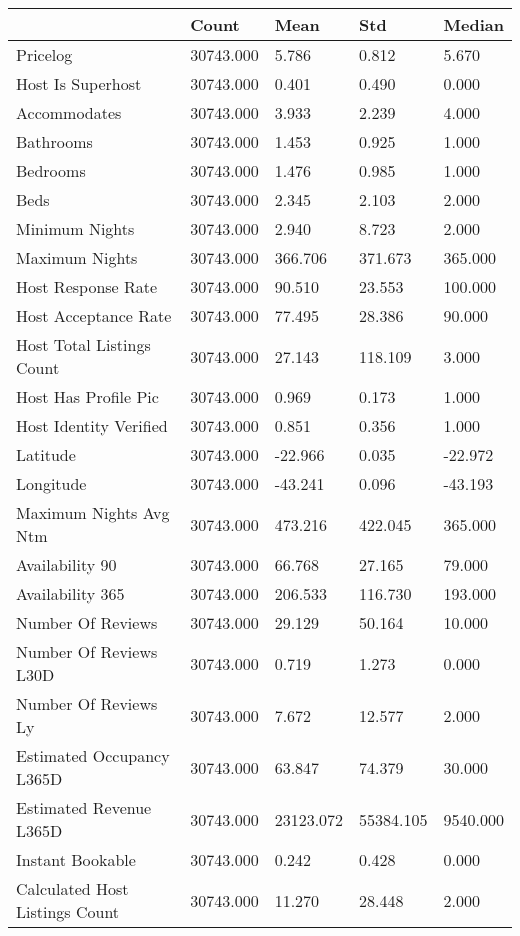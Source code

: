 \begin{tabular}{lllll}
\toprule
 & Count & Mean & Std & Median \\
\midrule
Pricelog & 30743.000 & 5.786 & 0.812 & 5.670 \\
Host Is Superhost & 30743.000 & 0.401 & 0.490 & 0.000 \\
Accommodates & 30743.000 & 3.933 & 2.239 & 4.000 \\
Bathrooms & 30743.000 & 1.453 & 0.925 & 1.000 \\
Bedrooms & 30743.000 & 1.476 & 0.985 & 1.000 \\
Beds & 30743.000 & 2.345 & 2.103 & 2.000 \\
Minimum Nights & 30743.000 & 2.940 & 8.723 & 2.000 \\
Maximum Nights & 30743.000 & 366.706 & 371.673 & 365.000 \\
Host Response Rate & 30743.000 & 90.510 & 23.553 & 100.000 \\
Host Acceptance Rate & 30743.000 & 77.495 & 28.386 & 90.000 \\
Host Total Listings Count & 30743.000 & 27.143 & 118.109 & 3.000 \\
Host Has Profile Pic & 30743.000 & 0.969 & 0.173 & 1.000 \\
Host Identity Verified & 30743.000 & 0.851 & 0.356 & 1.000 \\
Latitude & 30743.000 & -22.966 & 0.035 & -22.972 \\
Longitude & 30743.000 & -43.241 & 0.096 & -43.193 \\
Maximum Nights Avg Ntm & 30743.000 & 473.216 & 422.045 & 365.000 \\
Availability 90 & 30743.000 & 66.768 & 27.165 & 79.000 \\
Availability 365 & 30743.000 & 206.533 & 116.730 & 193.000 \\
Number Of Reviews & 30743.000 & 29.129 & 50.164 & 10.000 \\
Number Of Reviews L30D & 30743.000 & 0.719 & 1.273 & 0.000 \\
Number Of Reviews Ly & 30743.000 & 7.672 & 12.577 & 2.000 \\
Estimated Occupancy L365D & 30743.000 & 63.847 & 74.379 & 30.000 \\
Estimated Revenue L365D & 30743.000 & 23123.072 & 55384.105 & 9540.000 \\
Instant Bookable & 30743.000 & 0.242 & 0.428 & 0.000 \\
Calculated Host Listings Count & 30743.000 & 11.270 & 28.448 & 2.000 \\

\end{tabular}
